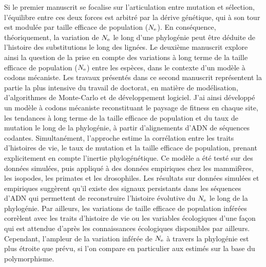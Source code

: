 Si le premier manuscrit se focalise sur l'articulation entre mutation et sélection, l'équilibre entre ces deux forces est arbitré par la dérive génétique, qui à son tour est modulée par taille efficace de population ($N_{\textrm{e}}$).
En conséquence, théoriquement, la variation de $N_{\textrm{e}}$ le long d'une phylogénie peut être déduite de l'histoire des substitutions le long des lignées.
Le deuxième manuscrit explore ainsi la question de la prise en compte des variations à long terme de la taille efficace de population ($N_{\textrm{e}}$) entre les espèces, dans le contexte d'un modèle à codons mécaniste.
Les travaux présentés dans ce second manuscrit représentent la partie la plus intensive du travail de doctorat, en matière de modélisation, d'algorithmes de Monte-Carlo et de développement logiciel.
J'ai ainsi développé un modèle à codons mécaniste reconstituant le paysage de fitness en chaque site, les tendances à long terme de la taille efficace de population et du taux de mutation le long de la phylogénie, à partir d’alignements d'ADN de séquences codantes.
Simultanément, l'approche estime la corrélation entre les traits d’histoires de vie, le taux de mutation et la taille efficace de population, prenant explicitement en compte l'inertie phylogénétique.
Ce modèle a été testé sur des données simulées, puis appliqué à des données empiriques chez les mammifères, les isopodes, les primates et les drosophiles.
Les résultats sur données simulées et empiriques suggèrent qu'il existe des signaux persistants dans les séquences d’ADN qui permettent de reconstruire l'histoire évolutive du $N_{\textrm{e}}$ le long de la phylogénie.
Par ailleurs, les variations de taille efficace de population inférées corrèlent avec les traits d’histoire de vie ou les variables écologiques d'une façon qui est attendue d'après les connaissances écologiques disponibles par ailleurs.
Cependant, l'ampleur de la variation inférée de $N_{\textrm{e}}$ à travers la phylogénie est plus étroite que prévu, si l'on compare en particulier aux estimés sur la base du polymorphisme.

